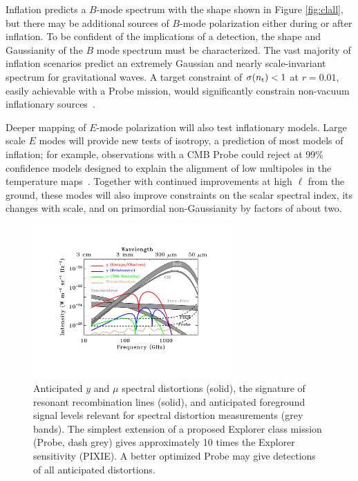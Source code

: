 Inflation predicts a $B$-mode spectrum with the shape shown in Figure \ref{fig:clall}, but there may be additional sources of $B$-mode polarization either during or after 
inflation. To be confident of the implications of a detection, the shape and Gaussianity of the $B$ mode spectrum 
must be characterized. The vast majority of inflation scenarios predict an extremely Gaussian and nearly scale-invariant spectrum for 
gravitational waves. A target constraint of $\sigma(n_{\rm t})<1$ at $r=0.01$, easily achievable with a Probe mission, would significantly constrain non-vacuum 
inflationary sources~\cite{Namba:2015gja,Peloso:2016gqs}.

Deeper mapping of $E$-mode polarization will also test inflationary models. Large scale $E$ modes will provide new tests of isotropy, a prediction of most models of inflation; 
for example, observations with a CMB Probe could reject at 99\% confidence models designed to explain the alignment of low multipoles in the temperature maps~\cite{Dvorkin:2007jp}. 
Together with continued improvements at high $\ell$ from the ground, these modes will also improve constraints on the scalar 
spectral index, its changes with scale, and on primordial non-Gaussianity by factors of about two. 

\begin{figure}[ht!]
\hspace{-0.2in}
\parbox{4.0in}{\centerline {
\includegraphics[width=3.0in]{Figures/probe_spectral_foregrounds_v3.pdf} } }
\hspace{-0.05in}
\parbox{2.5in}{
\caption{ \small \setlength{\baselineskip}{0.95\baselineskip}
Anticipated $y$ and $\mu$ spectral distortions (solid), the signature of resonant recombination lines (solid), and anticipated foreground 
signal levels relevant for spectral distortion measurements (grey bands). 
The simplest extension of a proposed
Explorer class mission (Probe, dash grey) gives approximately 10 times the Explorer sensitivity (PIXIE). 
A better optimized Probe may give detections of all anticipated distortions. 
\label{fig:distortions} } }
\vspace{-0.1in}
\end{figure}

